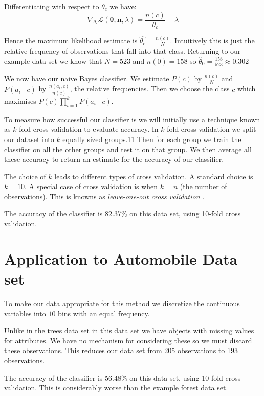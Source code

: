 Differentiating with respect to $\theta_c$ we have:
\begin{equation}
	\nabla_{\theta_c} \mathcal{L}(\mathbf{\theta}, \mathbf{n}, \lambda) = \frac{n(c)}{\theta_c} - \lambda
\end{equation}

Hence the maximum likelihood estimate is $\hat{\theta_c} = \frac{n(c)}{N}$.
Intuitively this is just the relative frequency of observations that fall into that class.
Returning to our example data set we know that $N=523$ and $n(0)=158$ so $\hat\theta_0 = \frac{158}{523} \approx 0.302$

We now have our naive Bayes classifier.
We estimate $P(c)$ by $\frac{n(c)}{N}$ and $P(a_i \mid c)$ by $\frac{n(a_i, c)}{n(c)}$, the relative frequencies.
Then we choose the class $c$ which maximises $P(c)\prod_{i=1}^{k}P(a_i \mid c)$.

To measure how successful our classifier is we will initially use a technique known as $k$-fold cross validation to evaluate accuracy.
In $k$-fold cross validation we split our dataset into $k$ equally sized groups.11
Then for each group we train the classifier on all the other groups and test it on that group.
We then average all these accuracy to return an estimate for the accuracy of our classifier.

The choice of $k$ leads to different types of cross validation.
A standard choice is $k=10$. A special case of cross validation is when $k=n$ (the number of observations).
This is knowns as \textit{leave-one-out cross validation} \cite{Priddy05}.

The accuracy of the classifier is 82.37\% on this data set, using 10-fold cross validation.

\section{Application to Automobile Data set}

To make our data appropriate for this method we discretize the continuous variables into $10$ bins with an equal frequency.

Unlike in the trees data set in this data set we have objects with missing values for attributes.
We have no mechanism for considering these so we must discard these observations.
This reduces our data set from 205 observations to 193 observations.

The accuracy of the classifier is 56.48\% on this data set, using 10-fold cross validation.
This is considerably worse than the example forest data set.

